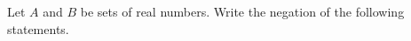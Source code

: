 \documentclass[../main.tex]{subfiles}
\begin{document}
\problem{}
Let \(A\) and \(B\) be sets of real numbers. Write the negation of the following
statements.





\end{document}
